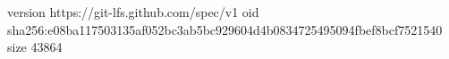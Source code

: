 version https://git-lfs.github.com/spec/v1
oid sha256:e08ba117503135af052bc3ab5bc929604d4b0834725495094fbef8bcf7521540
size 43864

